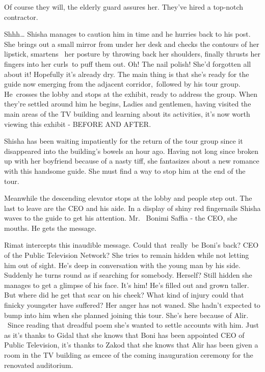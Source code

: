 \documentclass[letterpaper]{article}
\begin{document}
{\textquotedbl}Of course they will,{\textquotedbl} the elderly guard assures her. {\textquotedbl}They've hired a
top-notch contractor.{\textquotedbl}

{\textquotedbl}Shhh{\dots}{\textquotedbl} Shisha manages to caution him in time and he hurries back to his post. She
brings out a small mirror from under her desk and checks the contours of her lipstick, smartens {\ }her
posture by{ }throwing back her shoulders, finally thrusts her fingers into her curls~to puff them out.
Oh! The nail polish! She'd forgotten all about it! Hopefully it's already dry. The main thing is that she's ready for
the guide now emerging from the adjacent corridor,~followed by his tour group. He~crosses the lobby and stops at the
exhibit, ready to address the group. When they're settled around him he begins, {\textquotedbl}Ladies and gentlemen,
having visited the main areas of the TV building and learning about its activities, it's now worth viewing this exhibit
- BEFORE AND AFTER.{\textquotedbl}

Shisha has been waiting impatiently for the return of the tour group since it disappeared into the building's bowels an
hour ago. Having not long since broken up with her boyfriend because of a nasty tiff, she fantasizes about a new
romance with this handsome guide. She must find a way to stop him at the end of the tour. 

Meanwhile the descending elevator stops at the lobby and people step out. The last to leave are the CEO and his aide. In
a display of shiny red fingernails Shisha waves to the guide to get his attention. {\textquotedbl}Mr. ~Bonimi Saffia -
the CEO,{\textquotedbl} she mouths. He gets the message. 

Rimat intercepts this inaudible message. Could that~really~be Boni's back? CEO of the Public Television Network? She
tries to remain hidden while not letting him out of sight. He's deep in conversation with the young man by his side.
Suddenly he turns round as if searching for somebody. Herself? Still hidden she manages to get a glimpse of his face.
It's him! He's filled out and grown taller. But where did he get that scar on his cheek? What kind of injury could that
finicky youngster have suffered? Her anger has not waned. She hadn't expected to bump into him when she planned joining
this tour\textcolor[rgb]{0.8901961,0.42352942,0.039215688}{.} She's here because of Alir. \ Since reading that dreadful
poem she's wanted to settle accounts with him. Just as it's thanks to Gidal that she knows that Boni has been appointed
CEO of Public Television, it's thanks to Zakod that she knows that Alir has been given a room in the TV building as
emcee of the\textcolor[rgb]{0.8901961,0.42352942,0.039215688}{
}coming\textcolor[rgb]{0.8901961,0.42352942,0.039215688}{ }inauguration ceremony for the renovated auditorium.
\end{document}
